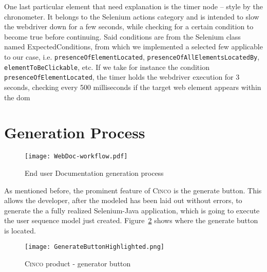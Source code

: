One last particular element that need explanation is the timer node -- style by the chronometer. It belongs to the Selenium actions category and is intended to slow the webdriver down for a few seconds, while checking for a certain condition to become true before continuing. Said conditions are from the Selenium class named ExpectedConditions, from which we implemented a selected few applicable to our case, i.e. \lstinline{presenceOfElementLocated}, \lstinline{presenceOfAllElementsLocatedBy}, \lstinline{elementToBeClickable}, etc. If we take for instance the condition \lstinline{presenceOfElementLocated}, the timer holds the webdriver execution for 3 seconds, checking every 500 milliseconds if the target web element appears within the \acrshort{dom}

\section{Generation Process}\label{sec:GenProcess}

\begin{figure}[h]
    \centering
    \texttt{[image: WebDoc-workflow.pdf]}
    \caption{End user Documentation generation process}
    \label{fig:WebDocWorkflow}
\end{figure}

As mentioned before, the prominent feature of \textsc{Cinco} is the generate button. This allows the developer, after the modeled has been laid out without errors, to generate the a fully realized Selenium-Java application, which is going to execute the user sequence model just created. Figure~\ref{fig:genButton} shows where the generate button is located.

\begin{figure}[H]
    \centering
    \texttt{[image: GenerateButtonHighlighted.png]}
    \caption{\textsc{Cinco} product - generator button}
    \label{fig:genButton}
\end{figure}
